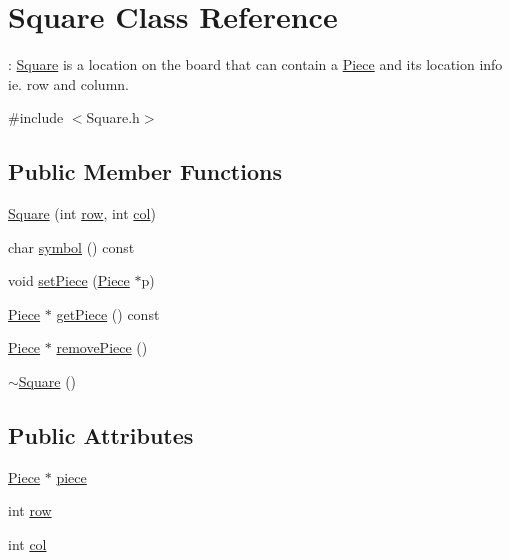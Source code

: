 \hypertarget{classSquare}{}\section{Square Class Reference}
\label{classSquare}


\+: \hyperlink{classSquare}{Square} is a location on the board that can contain a \hyperlink{classPiece}{Piece} and its location info ie. row and column.  




{\ttfamily \#include $<$Square.\+h$>$}

\subsection*{Public Member Functions}
\begin{DoxyCompactItemize}
\item 
\hyperlink{classSquare_a2fafe3d65a3b4166f1fe8b6540db2199}{Square} (int \hyperlink{classSquare_aa353950a9ef437401db55ae605b0f8b9}{row}, int \hyperlink{classSquare_a08d4af37ead0391bec8f9cbaff083da0}{col})
\item 
char \hyperlink{classSquare_aadadc7c924a6f07fd13d271118e65a16}{symbol} () const 
\item 
void \hyperlink{classSquare_a7cf9aa874fea67f6a9056cad15752ab2}{set\+Piece} (\hyperlink{classPiece}{Piece} $\ast$p)
\item 
\hyperlink{classPiece}{Piece} $\ast$ \hyperlink{classSquare_ab5b0c359853874b38c17bbe0b3f6aadf}{get\+Piece} () const 
\item 
\hyperlink{classPiece}{Piece} $\ast$ \hyperlink{classSquare_a21ec1e5b9fb287c33f911ef032443503}{remove\+Piece} ()
\item 
\hyperlink{classSquare_a90af7ce1060cff7b717ceddb333846b8}{$\sim$\+Square} ()
\end{DoxyCompactItemize}
\subsection*{Public Attributes}
\begin{DoxyCompactItemize}
\item 
\hyperlink{classPiece}{Piece} $\ast$ \hyperlink{classSquare_a52eab334fb3f4fe8d29f1f1b7570a52f}{piece}
\item 
int \hyperlink{classSquare_aa353950a9ef437401db55ae605b0f8b9}{row}
\item 
int \hyperlink{classSquare_a08d4af37ead0391bec8f9cbaff083da0}{col}
\end{DoxyCompactItemize}


